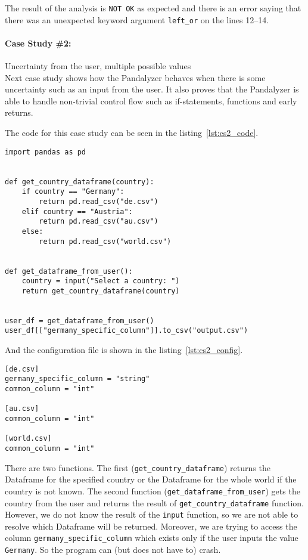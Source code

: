 The result of the analysis is \verb|NOT OK| as expected and there is an error saying that there was an unexpected
keyword argument \verb|left_or| on the lines 12--14.


\paragraph{Case Study \#2:} Uncertainty from the user, multiple possible values \\

Next case study shows how the Pandalyzer behaves when there is some uncertainty such as an input from the user.
It also proves that the Pandalyzer is able to handle non-trivial control flow such as if-statements, functions and
early returns.

The code for this case study can be seen in the listing~\ref{lst:cs2_code}.

\begin{lstlisting}[caption=Code of the second case study in Pandas, label={lst:cs2_code}, captionpos=b]
import pandas as pd


def get_country_dataframe(country):
    if country == "Germany":
        return pd.read_csv("de.csv")
    elif country == "Austria":
        return pd.read_csv("au.csv")
    else:
        return pd.read_csv("world.csv")


def get_dataframe_from_user():
    country = input("Select a country: ")
    return get_country_dataframe(country)


user_df = get_dataframe_from_user()
user_df[["germany_specific_column"]].to_csv("output.csv")
\end{lstlisting}

And the configuration file is shown in the listing~\ref{lst:cs2_config}.

\begin{lstlisting}[caption=config.toml file for the second case study, label={lst:cs2_config}, captionpos=b]
[de.csv]
germany_specific_column = "string"
common_column = "int"

[au.csv]
common_column = "int"

[world.csv]
common_column = "int"
\end{lstlisting}

There are two functions.
The first (\verb|get_country_dataframe|) returns the Dataframe for the specified country or the Dataframe for the whole
world if the country is not known.
The second function (\verb|get_dataframe_from_user|) gets the country from the user and returns the result of
\verb|get_country_dataframe| function.
However, we do not know the result of the \verb|input| function, so we are not able to resolve which Dataframe will
be returned.
Moreover, we are trying to access the column \verb|germany_specific_column| which exists only if the user inputs
the value \verb|Germany|.
So the program can (but does not have to) crash.

